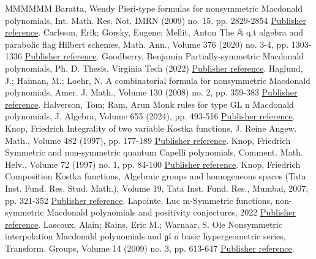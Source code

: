 \documentclass[11pt]{article}
\theoremstyle{definition}
\numberwithin{equation}{section}
\begin{document}
\begin{thebibliography}{MMMMMM}
 Baratta, Wendy Pieri-type formulas for nonsymmetric Macdonald polynomials, Int. Math. Res. Not. IMRN (2009) no. 15, pp. 2829-2854 \href{https://alco.centre-mersenne.org/articles/10.5802/alco.388/#MR2525842}{Publisher reference}.
 Carlsson, Erik; Gorsky, Eugene; Mellit, Anton The 𝔸 q,t  algebra and parabolic flag Hilbert schemes, Math. Ann., Volume 376 (2020) no. 3-4, pp. 1303-1336 \href{https://alco.centre-mersenne.org/articles/10.5802/alco.388/#MR4081116}{Publisher reference}.
 Goodberry, Benjamin Partially-symmetric Macdonald polynomials, Ph. D. Thesis, Virginia Tech (2022) \href{https://alco.centre-mersenne.org/articles/10.5802/alco.388/#Dissertation}{Publisher reference}.
 Haglund, J.; Haiman, M.; Loehr, N. A combinatorial formula for nonsymmetric Macdonald polynomials, Amer. J. Math., Volume 130 (2008) no. 2, pp. 359-383 \href{https://alco.centre-mersenne.org/articles/10.5802/alco.388/#MR2405160}{Publisher reference}.
 Halverson, Tom; Ram, Arun Monk rules for type GL n  Macdonald polynomials, J. Algebra, Volume 655 (2024), pp. 493-516 \href{https://alco.centre-mersenne.org/articles/10.5802/alco.388/#MR4756478}{Publisher reference}.
 Knop, Friedrich Integrality of two variable Kostka functions, J. Reine Angew. Math., Volume 482 (1997), pp. 177-189 \href{https://alco.centre-mersenne.org/articles/10.5802/alco.388/#MR1427661}{Publisher reference}.
 Knop, Friedrich Symmetric and non-symmetric quantum Capelli polynomials, Comment. Math. Helv., Volume 72 (1997) no. 1, pp. 84-100 \href{https://alco.centre-mersenne.org/articles/10.5802/alco.388/#MR1456318}{Publisher reference}.
 Knop, Friedrich Composition Kostka functions, Algebraic groups and homogeneous spaces (Tata Inst. Fund. Res. Stud. Math.), Volume 19, Tata Inst. Fund. Res., Mumbai, 2007, pp. 321-352 \href{https://alco.centre-mersenne.org/articles/10.5802/alco.388/#MR2348910}{Publisher reference}.
 Lapointe, Luc m-Symmetric functions, non-symmetric Macdonald polynomials and positivity conjectures, 2022 \href{https://alco.centre-mersenne.org/articles/10.5802/alco.388/#Lapointe}{Publisher reference}.
 Lascoux, Alain; Rains, Eric M.; Warnaar, S. Ole Nonsymmetric interpolation Macdonald polynomials and \(\mathfrak{g}\)\(\mathfrak{l}\) n  basic hypergeometric series, Transform. Groups, Volume 14 (2009) no. 3, pp. 613-647 \href{https://alco.centre-mersenne.org/articles/10.5802/alco.388/#MR2534801}{Publisher reference}.

\end{thebibliography}
\end{document}
